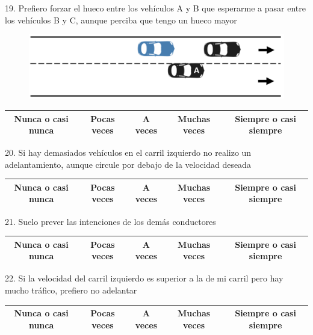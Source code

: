 19. Prefiero forzar el hueco entre los vehículos A y B que esperarme a pasar entre los vehículos B y C, aunque perciba que tengo un hueco mayor
\begin{figure}[H]
    \centering
    \includegraphics[width=14cm]
    {figures/B2.png}
\end{figure}
\vspace{-10pt}
\begin{table}[H]
\centering
\begin{tabular}{|c|c|c|c|c|}
\hline
Nunca o casi nunca & Pocas veces & A veces & Muchas veces & Siempre o casi siempre \\ \hline
\end{tabular}
\end{table}
\newpage

20. Si hay demasiados vehículos en el carril izquierdo no realizo un adelantamiento, aunque circule por debajo de la velocidad deseada
\vspace{-10pt}
\begin{table}[H]
\centering
\begin{tabular}{|c|c|c|c|c|}
\hline
Nunca o casi nunca & Pocas veces & A veces & Muchas veces & Siempre o casi siempre \\ \hline
\end{tabular}
\end{table}

21. Suelo prever las intenciones de los demás conductores
\vspace{-10pt}
\begin{table}[h]
\centering
\begin{tabular}{|c|c|c|c|c|}
\hline
Nunca o casi nunca & Pocas veces & A veces & Muchas veces & Siempre o casi siempre \\ \hline
\end{tabular}
\end{table}

22. Si la velocidad del carril izquierdo es superior a la de mi carril pero hay mucho tráfico, prefiero no adelantar
\vspace{-10pt}
\begin{table}[H]
\centering
\begin{tabular}{|c|c|c|c|c|}
\hline
Nunca o casi nunca & Pocas veces & A veces & Muchas veces & Siempre o casi siempre \\ \hline
\end{tabular}
\end{table}

